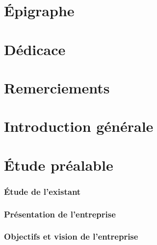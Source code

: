 \documentclass[12pt, a4paper]{report}
\begin{document}
    

    \chapter*{Épigraphe}\label{cha:epigraphe}

    \chapter*{Dédicace}\label{cha:dedicace}

    \chapter*{Remerciements}\label{cha:remerciements}

    \chapter*{Introduction générale}\label{cha:introduction-generale}
    

    \tableofcontents

    \chapter{Étude préalable}\label{cha:etude-prealable}  

    \subsection{Étude de l'existant}\label{subsec:etude-de-l-existant}
    
  
    \newpage
    \subsection{Présentation de l’entreprise}\label{subsec:presentation-de-l-entreprise}
    
    
    
    \subsection{Objectifs et vision de l’entreprise}\label{subsec:objectifs-et-vision-de-l-entreprise}
    
    
\end{document}
